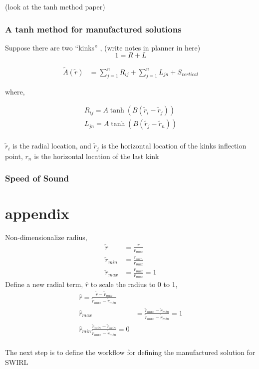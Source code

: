 \documentclass[a4paper]{article}
\begin{document}
(look at the tanh method paper)
\subsubsection{A tanh method for manufactured solutions}

Suppose there are two ``kinks'' , (write notes in planner in here)
\[ 1 = R + L \]

\begin{align*}
    \widetilde{A}(\widetilde{r}) &= 
    \sum_{j=1}^{n} R_{ij} +
    \sum_{j=1}^{n} L_{jn} + 
    S_{vertical} 
\end{align*}

where,

\begin{align*}
    R_{ij} = A \tanh \left( B \left( \widetilde{r}_i - \widetilde{r}_{j} \right) \right)\\
    L_{jn} = A \tanh \left( B \left( \widetilde{r}_j - \widetilde{r}_{n} \right) \right)\\
\end{align*}

$\widetilde{r}_i$ is the radial location, and $\widetilde{r}_j$ is the horizontal location of the kinks inflection point,
$r_n$ is the horizontal location of the last kink
\subsubsection{Speed of Sound}

\section{appendix}
Non-dimensionalize radius,
\begin{align}
    \widetilde{r}     &= \frac{r}{r_{max}}                \\
    \widetilde{r}_{min}   &= \frac{r_{min}}{r_{max}}    \\
    \widetilde{r}_{max}   &= \frac{r_{max}}{r_{max}} = 1
    \label{eq:1}
\end{align}
Define a new radial term, $\hat{r}$ to scale the radius to 0 to 1,
\begin{align}
    \hat{r} = 
    \frac{\widetilde{r}      - \widetilde{r}_{min}} 
         {\widetilde{r}_{max} - \widetilde{r}_{min}} \\
         \hat{r}_{max} &= 
         \frac{\widetilde{r}_{max}      - \widetilde{r}_{min}} 
         {\widetilde{r}_{max} - \widetilde{r}_{min}} = 1 \\
         \hat{r}_{min}
         \frac{\widetilde{r}_{min}      - \widetilde{r}_{min}} 
         {\widetilde{r}_{max} - \widetilde{r}_{min}} = 0 \\
    \label{eq:2}
\end{align}

The next step is to define the workflow for defining the manufactured solution 
for SWIRL
\end{document}
